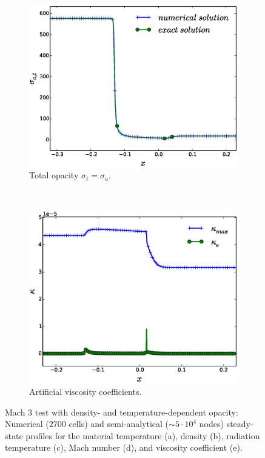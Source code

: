 \documentclass[times,doublespace]{fldauth}%
\begin{document}
\begin{figure}[h]
\begin{subfigure}{0.49\textwidth}
    \includegraphics[width=\linewidth]{figures/dpt-xs/mass-diff-opacity-nel-2700-plot.eps}
    \caption{Total opacity $\sigma_t = \sigma_a$.}\label{fig:mach-3-dpt-xs-xs}
    \end{subfigure}
    ~
    \begin{subfigure}{0.49\textwidth}
    \includegraphics[width=\linewidth]{figures/dpt-xs/mass-diff-visc-nel-2700-plot.eps}
    \caption{Artificial viscosity coefficients.}\label{fig:mach-3-dpt-xs-visc}
    \end{subfigure}      
\caption{Mach $3$ test with density- and temperature-dependent opacity:  Numerical ($2700$ cells) and semi-analytical ($\sim 5 \cdot 10^4$ nodes) steady-state profiles for the material temperature (a), density (b), radiation temperature (c),  Mach number (d), and viscosity coefficient (e).}\label{fig:mach-3-temp-dep-xs}    
\end{figure}
\end{document}
